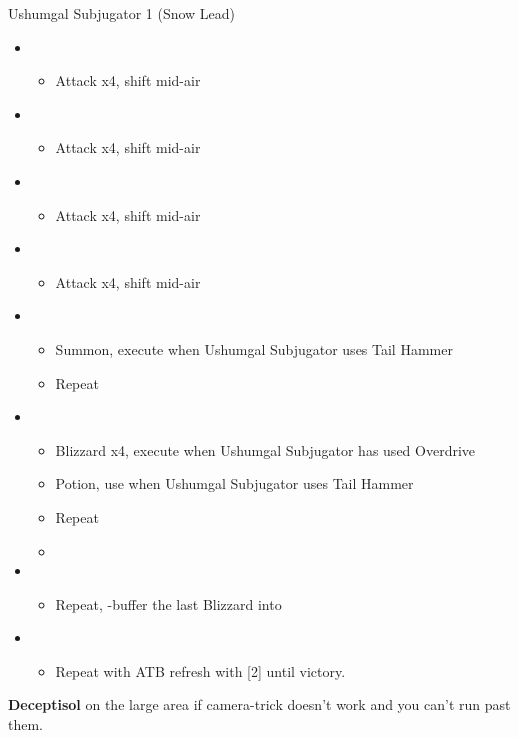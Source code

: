 	\begin{battle}[1:25]{Ushumgal Subjugator 1 (Snow Lead)}
		\begin{itemize}
			\item \first
			      \begin{itemize}
				      \item Attack x4, shift mid-air
			      \end{itemize}
			\item \second
			      \begin{itemize}
				      \item Attack x4, shift mid-air
			      \end{itemize}
			\item \first
			      \begin{itemize}
				      \item Attack x4, shift mid-air
			      \end{itemize}
			\item \second
			      \begin{itemize}
				      \item Attack x4, shift mid-air
			      \end{itemize}
			\item \first
			      \begin{itemize}
				      \item Summon, execute when Ushumgal Subjugator uses Tail Hammer
				      \item Repeat
			      \end{itemize}
			\item \fifth
			      \begin{itemize}
				      \item Blizzard x4, execute when Ushumgal Subjugator has used Overdrive
				      \item Potion, use when Ushumgal Subjugator uses Tail Hammer
				      \item Repeat
				      \item \stagger
			      \end{itemize}
			\item \sixth
			      \begin{itemize}
				      \item Repeat, \com-buffer the last Blizzard into
			      \end{itemize}
			\item \first
			      \begin{itemize}
				      \item Repeat with ATB refresh with [2] until victory.
			      \end{itemize}
		\end{itemize}
	\end{battle}
	\textbf{Deceptisol} on the large area if camera-trick doesn't work and you can't run past them.

